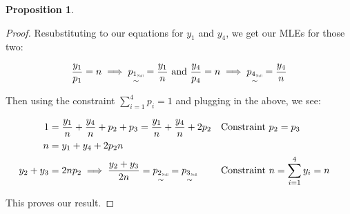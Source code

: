 \documentclass[12pt, letterpaper]{article}
\theoremstyle{definition}
\newtheorem{prop}{Proposition}[theorem]
\numberwithin{equation}{section}
\newcommand{\+}[1]{+_{\scalebox{.375}{#1}}}
\newcommand{\1}{\mathbbm{1}}
\begin{document}
\begin{prop}
\begin{proof}
	Resubstituting to our equations for $y_1$ and $y_4$, we get our MLEs for those two:
	
	\begin{align*}
		\frac{y_1}{p_1}=n \implies \underset{\sim}{{p_1}_{\scalebox{.35}{Null}}}=\frac{y_1}{n} \text{ and } \frac{y_4}{p_4}=n \implies \underset{\sim}{{p_4}_{\scalebox{.35}{Null}}}=\frac{y_4}{n}
	\end{align*}

	Then using the constraint $\sum\limits_{i=1}^{4}p_i=1$ and plugging in the above, we see:
	
	\begin{align*}
		1&=\frac{y_1}{n}+\frac{y_4}{n}+p_2+p_3=\frac{y_1}{n}+\frac{y_4}{n}+2p_2 &&\text{Constraint $p_2=p_3$}\\
		n&=y_1+y_4+2p_2n\\
		y_2+y_3&=2np_2 \implies \frac{y_2+y_3}{2n}=\underset{\sim}{{p_2}_{\scalebox{.35}{Null}}}=\underset{\sim}{{p_3}_{\scalebox{.35}{Null}}} &&\text{Constraint $n=\sum\limits_{i=1}^{4}y_i=n$}&
	\end{align*}

	This proves our result.
	\end{proof}
\end{prop}
\end{document}

